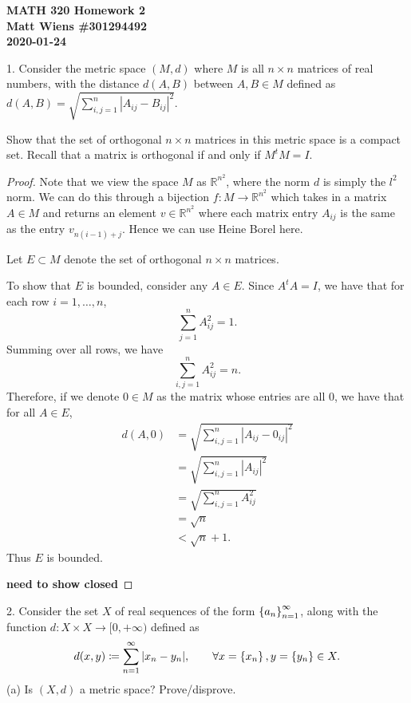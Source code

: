 \documentclass{article}
\newcommand{\R}{\mathbb{R}}
\begin{document}
\textbf{MATH 320 Homework 2} \\
\textbf{Matt Wiens \#301294492} \\
\textbf{2020-01-24}

1. Consider the metric space $(M, d)$ where $M$ is all $n \times n$
matrices of real numbers, with the distance $d(A, B)$ between $A, B
\in M$ defined as $d(A, B)= \sqrt{\sum_{i, j = 1}^n |A_{i j} - B_{i j}|^2}$.

Show that the set of orthogonal $n \times n$ matrices in this metric
space is a compact set. Recall that a matrix is orthogonal if and only
if $M^t M = I$.

\begin{proof}

Note that we view the space $M$ as $\R^{n^2}$, where the norm $d$ is
simply the $l^2$ norm. We can do this through a bijection $f: M \to
\R^{n^2}$ which takes in a matrix $A \in M$ and returns an element $v
\in \R^{n^2}$ where each matrix entry $A_{ij}$ is the same as the entry
$v_{n (i - 1) + j}$. Hence we can use Heine Borel here.

Let $E \subset M$ denote the set of orthogonal $n \times n$ matrices.

To show that $E$ is bounded, consider any $A \in E$. Since $A^t A = I$,
we have that for each row $i = 1, \ldots, n$,
%
\begin{equation*}
    \sum_{j = 1}^n A_{ij}^2 = 1
    .
\end{equation*}
%
Summing over all rows, we have
%
\begin{equation*}
    \sum_{i, j = 1}^n A_{ij}^2 = n
    .
\end{equation*}
%
Therefore, if we denote $0 \in M$ as the matrix whose entries are all
$0$, we have that for all $A \in E$,
%
\begin{align*}
    d(A, 0)
        &= \sqrt{\sum_{i, j = 1}^n |A_{i j} - 0_{i j}|^2} \\
        &= \sqrt{\sum_{i, j = 1}^n |A_{i j}|^2} \\
        &= \sqrt{\sum_{i, j = 1}^n A_{i j}^2} \\
        &= \sqrt{n} \\
        &< \sqrt{n} + 1
        .
\end{align*}
%
Thus $E$ is bounded.

\textbf{need to show closed}

\end{proof}

\newpage

2. Consider the set $X$ of real sequences of the form $\cbr{a_n}_{ n=
   1}^\infty$, along with the function $d: X \times X \rightarrow [0,
   +\infty)$ defined as
%
\begin{equation*}
    d(x, y) \coloneqq \sum_{n = 1}^\infty |x_n - y_n|,
    \qquad \forall x = \cbr{x_n}, y = \cbr{y_n} \in X
    .
\end{equation*}
%
(a) Is $(X,d)$ a metric space? Prove/disprove.
\end{document}
